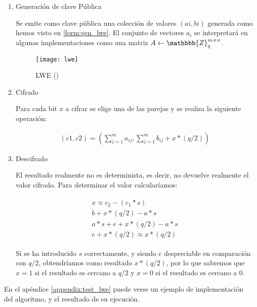\begin{enumerate}
  \item Generación de clave Pública

  Se emite como clave pública una colección de valores $(ai, bi)$ generada como hemos visto en \ref{form:gen_lwe}. El conjunto de vectores $a_i$ se interpretará en algunas implementaciones como una matriz $A \leftarrow \mathbbb{Z}_q^{m \times n}$.

    \begin{figure}[h]
      \caption{LWE (\cite{halevi_homomorphic_2017})}
      \label{fig:lwe}
      \texttt{[image: lwe]}
    \end{figure}

  \item Cifrado

  Para cada bit $x$ a cifrar se elige una de las parejas y se realiza la siguiente operación:

    \begin{gather}
        \label{form:cifrado_lwe}
        (c1, c2) = (\sum_{j=1}^{m} a_{ij}, \sum_{j=1}^{m} b_{ij} + x * (q/2))
    \end{gather}

  \item Descifrado

  El resultado realmente no es determinista, es decir, no devuelve realmente el valor cifrado. Para determinar el valor calcularíamos:

    \begin{gather}
        \label{form:descifrado_lwe}
        \begin{split}
            x \approx c_2 - (c_1*s) \\
            b + x*(q/2) - a*s \\
            a*s + e + x*(q/2) - a*s \\
            e + x*(q/2) \approx x * (q/2)
        \end{split}
    \end{gather}

  Si se ha introducido $s$ correctamente, y siendo $e$ despreciable en comparación con $ q/2 $, obtendríamos como resultado $ x * (q/2) $, por lo que sabremos que $ x = 1$ si el resultado es cercano a $ q/2 $ y  $ x = 0 $ si el resultado es cercano a $ 0 $.

\end{enumerate}

En el apéndice \ref{appendix:test_lwe} puede verse un ejemplo de implementación del algoritmo, y el resultado de su ejecución.

